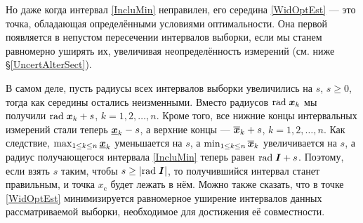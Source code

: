 \documentclass[a5paper,openany]{book}
\newcommand{\mbf}[1]{\protect\text{\boldmath$#1$}}
\newcommand{\ov}{\overline}
\newcommand{\un}{\underline}
\renewcommand{\r}{\mathrm{rad}\;}
\begin{document}
Но даже когда интервал \eqref{IncluMin} неправилен, его середина \eqref{WidOptEst} 
--- это точка, обладающая определёнными условиями оптимальности. Она первой появляется 
в непустом пересечении интервалов выборки, если мы станем равномерно уширять их, 
увеличивая неопределённость измерений (см. ниже \S\ref{UncertAlterSect}). 
  
В самом деле, пусть радиусы всех интервалов выборки увеличились на $s$, $s\geq 0$, 
тогда как середины остались неизменными. Вместо радиусов $\r\mbf{x}_{k}$ мы получили 
$\r\mbf{x}_{k} + s$, $k = 1,2,\ldots,n$. Кроме того, все нижние концы интервальных 
измерений стали теперь $\un{\mbf{x}}_{k} - s$, а верхние концы --- $\ov{\mbf{x}}_{k} + s$, 
$k = 1,2,\ldots,n$. Как следствие, $\max_{1\leq k\leq n} \un{\mbf{x}}_{k}$  уменьшается 
на $s$, а $\min_{1\leq  k\leq n} \ov{\mbf{x}}_{k}$ увеличивается на $s$, а радиус 
получающегося интервала \eqref{IncluMin} теперь равен $\r\mbf{I} + s$. Поэтому, если 
взять $s$ таким, чтобы $s\geq|\r\mbf{I}|$, то получившийся интервал станет правильным, 
и точка $x_\text{c}$ будет лежать в нём. Можно также сказать, что в точке \eqref{WidOptEst} 
минимизируется равномерное уширение интервалов данных рассматриваемой выборки, 
необходимое для достижения её совместности. 
  
\end{document}
